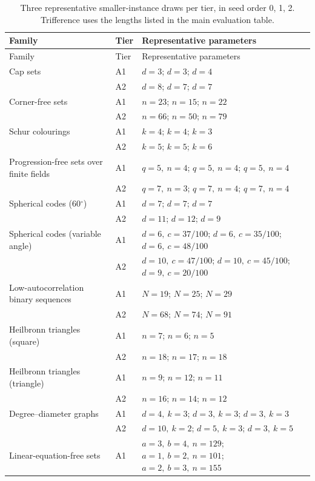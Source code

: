 \begin{longtable}{@{}P{.30\linewidth}lP{.56\linewidth}@{}}
\caption{Three representative smaller-instance draws per tier, in seed order 0, 1, 2. Trifference uses the lengths listed in the main evaluation table.}\label{tab:aux_parameters}\\
\toprule
Family & Tier & Representative parameters \\
\midrule\endfirsthead
\toprule
Family & Tier & Representative parameters \\
\midrule\endhead
\bottomrule\endfoot
Cap sets & A1 & $d=3$; $d=3$; $d=4$ \\
 & A2 & $d=8$; $d=7$; $d=7$ \\
\addlinespace[4pt]
Corner-free sets & A1 & $n=23$; $n=15$; $n=22$ \\
 & A2 & $n=66$; $n=50$; $n=79$ \\
\addlinespace[4pt]
Schur colourings & A1 & $k=4$; $k=4$; $k=3$ \\
 & A2 & $k=5$; $k=5$; $k=6$ \\
\addlinespace[4pt]
Progression-free sets over finite fields & A1 & $q=5,\ n=4$; $q=5,\ n=4$; $q=5,\ n=4$ \\
 & A2 & $q=7,\ n=3$; $q=7,\ n=4$; $q=7,\ n=4$ \\
\addlinespace[4pt]
Spherical codes (60$^\circ$) & A1 & $d=7$; $d=7$; $d=7$ \\
 & A2 & $d=11$; $d=12$; $d=9$ \\
\addlinespace[4pt]
Spherical codes (variable angle) & A1 & $d=6,\ c=37/100$; $d=6,\ c=35/100$; $d=6,\ c=48/100$ \\
 & A2 & $d=10,\ c=47/100$; $d=10,\ c=45/100$; $d=9,\ c=20/100$ \\
\addlinespace[4pt]
Low-autocorrelation binary sequences & A1 & $N=19$; $N=25$; $N=29$ \\
 & A2 & $N=68$; $N=74$; $N=91$ \\
\addlinespace[4pt]
Heilbronn triangles (square) & A1 & $n=7$; $n=6$; $n=5$ \\
 & A2 & $n=18$; $n=17$; $n=18$ \\
\addlinespace[4pt]
Heilbronn triangles (triangle) & A1 & $n=9$; $n=12$; $n=11$ \\
 & A2 & $n=16$; $n=14$; $n=12$ \\
\addlinespace[4pt]
Degree--diameter graphs & A1 & $d=4,\ k=3$; $d=3,\ k=3$; $d=3,\ k=3$ \\
 & A2 & $d=10,\ k=2$; $d=5,\ k=3$; $d=3,\ k=5$ \\
\addlinespace[4pt]
Linear-equation-free sets & A1 & $a=3,\ b=4,\ n=129$; $a=1,\ b=2,\ n=101$; $a=2,\ b=3,\ n=155$ \\

\end{longtable}
